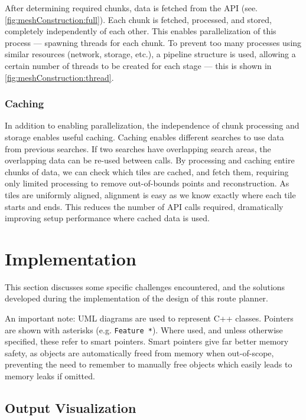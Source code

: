 \documentclass[12pt]{article}
\begin{document}
After determining required chunks, data is fetched from the API (see. \autoref{fig:meshConstruction:full}). Each chunk is fetched, processed, and stored, completely independently of each other. This enables parallelization of this process --- spawning threads for each chunk. To prevent too many processes using similar resources (network, storage, etc.), a pipeline structure is used, allowing a certain number of threads to be created for each stage --- this is shown in \autoref{fig:meshConstruction:thread}.


\subsubsection{Caching}

In addition to enabling parallelization, the independence of chunk processing and storage enables useful caching. Caching enables different searches to use data from previous searches. If two searches have overlapping search areas, the overlapping data can be re-used between calls. By processing and caching entire chunks of data, we can check which tiles are  cached, and fetch them, requiring only limited processing to remove out-of-bounds points and reconstruction. As tiles are uniformly aligned, alignment is easy as we know exactly where each tile starts and ends. This reduces the number of API calls required, dramatically improving setup performance where cached data is used.

\section{Implementation}

This section discusses some specific challenges encountered, and the solutions developed during the implementation of the design of this route planner.

An important note: UML diagrams are used to represent C++ classes. Pointers are shown with asterisks (e.g. \texttt{Feature *}). Where used, and unless otherwise specified, these refer to smart pointers. Smart pointers give far better memory safety, as objects are automatically freed from memory when out-of-scope, preventing the need to remember to manually free objects which easily leads to memory leaks if omitted.

\subsection{Output Visualization}
\end{document}

